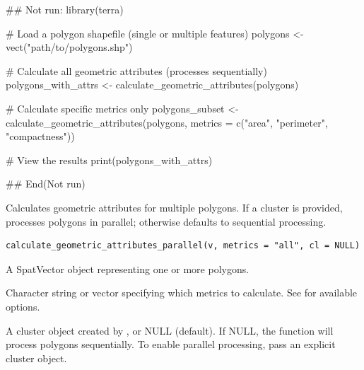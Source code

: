 \documentclass[letterpaper]{book}
\begin{document}
%
\begin{Examples}
\begin{ExampleCode}
## Not run: 
library(terra)

# Load a polygon shapefile (single or multiple features)
polygons <- vect("path/to/polygons.shp")

# Calculate all geometric attributes (processes sequentially)
polygons_with_attrs <- calculate_geometric_attributes(polygons)

# Calculate specific metrics only
polygons_subset <- calculate_geometric_attributes(polygons, 
                     metrics = c("area", "perimeter", "compactness"))

# View the results
print(polygons_with_attrs)

## End(Not run)
\end{ExampleCode}
\end{Examples}
%
\begin{Description}
Calculates geometric attributes for multiple polygons. If a cluster is provided,
processes polygons in parallel; otherwise defaults to sequential processing.
\end{Description}
%
\begin{Usage}
\begin{verbatim}
calculate_geometric_attributes_parallel(v, metrics = "all", cl = NULL)
\end{verbatim}
\end{Usage}
%
\begin{Arguments}
\begin{ldescription}
\item[\code{v}] A SpatVector object representing one or more polygons.

\item[\code{metrics}] Character string or vector specifying which metrics to calculate.
See  for available options.

\item[\code{cl}] A cluster object created by , or NULL (default).
If NULL, the function will process polygons sequentially. To enable parallel
processing, pass an explicit cluster object.
\end{ldescription}
\end{Arguments}
%
\end{document}
